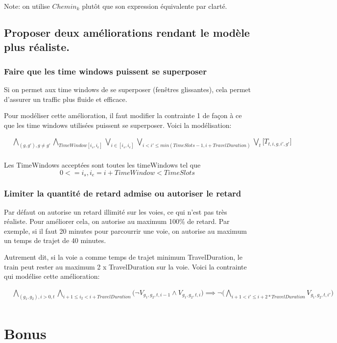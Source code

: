 \documentclass[a4paper]{article}
\begin{document}
Note: on utilise $Chemin_k$ plutôt que son expression équivalente par clarté.

\subsection{Proposer deux améliorations rendant le modèle plus réaliste.}

\subsubsection{Faire que les time windows puissent se superposer}

Si on permet aux time windows de se superposer (fenêtres glissantes), cela permet d'assurer un traffic plus fluide et efficace.

Pour modéliser cette amélioration, il faut modifier la contrainte 1 de façon à ce que les time windows utilisées puissent se superposer. Voici la modélisation:

   \begin{equation*}
    \begin{split}
      & 
      \bigwedge_{(g,g'), g \neq g'} 
      \bigwedge_{TimeWindow [i_s,i_e]}
      \bigvee_{i \in [i_s,i_e]}
      \bigvee_{i < i' \leq min(TimeSlots - 1, i + TravelDuration)}
      \bigvee_{t}
      \big[T_{t,i,g,i', g'}] \\
    \end{split}
    \end{equation*}
    
Les TimeWindows acceptées sont toutes les timeWindows tel que 
$$0 <= i_s, i_e = i + TimeWindow < TimeSlots$$

\subsubsection{Limiter la quantité de retard admise ou autoriser le retard}

Par défaut on autorise un retard illimité sur les voies, ce qui n'est pas très réaliste. Pour améliorer cela, on autorise au maximum 100\% de retard. Par exemple, si il faut 20 minutes pour parcourrir une voie, on autorise au maximum un temps de trajet de 40 minutes.

Autrement dit, si la voie a comme temps de trajet minimum TravelDuration, le train peut rester au maximum 2 x TravelDuration sur la voie. Voici la contrainte qui modélise cette amélioration: 

\begin{equation*}
    \begin{split}
      & \bigwedge_{(g_1, g_2), i > 0, t} 
        \bigwedge_{i+1\leq i_2<i+TravelDuration} 
        \big( \neg V_{g_1, g_2, t, i-1} \land  V_{g_1, g_2, t, i}\big)
        \implies   
        \neg \big( 
        \bigwedge_{i + 1 < i' \leq i + 2 * TravelDuration} 
        V_{g_1, g_2, t, i'} \big) \\
    \end{split}
    \end{equation*}



\section{Bonus}
\end{document}
